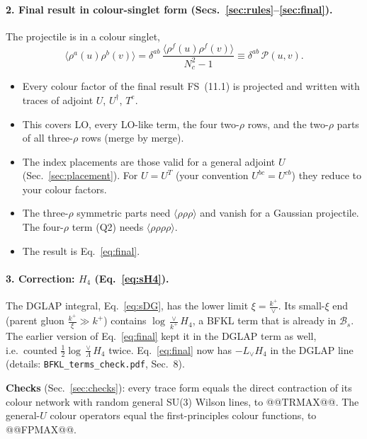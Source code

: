 \documentclass[10pt]{article}
\numberwithin{equation}{section}
\newcommand{\new}[1]{{\color{blue}#1}}
\newcommand{\Lv}{L_{\vee}}
\newcommand{\BB}{\mathcal B}
\newcommand{\PP}{\mathcal P}
\begin{document}
\paragraph{2. Final result in colour-singlet form (Secs.~\ref{sec:rules}--\ref{sec:final}).} The projectile is in a colour singlet,
\begin{equation*}
\langle\rho^a(u)\rho^b(v)\rangle=\delta^{ab}\,\frac{\langle\rho^f(u)\rho^f(v)\rangle}{N_c^2-1}\equiv\delta^{ab}\,\PP(u,v).
\end{equation*}
\begin{itemize}
\item Every colour factor of the final result FS~(11.1) is projected and written with traces of adjoint $U$, $U^\dagger$, $T^e$.
\item This covers LO, every LO-like term, the four two-$\rho$ rows, and the two-$\rho$ parts of all three-$\rho$ rows (merge by merge).
\item The index placements are those valid for a general adjoint $U$ (Sec.~\ref{sec:placement}). For $U=U^T$ (your convention $U^{bc}=U^{cb}$) they reduce to your colour factors.
\item The three-$\rho$ symmetric parts need $\langle\rho\rho\rho\rangle$ and vanish for a Gaussian projectile. The four-$\rho$ term (Q2) needs $\langle\rho\rho\rho\rho\rangle$.
\item The result is Eq.~\eqref{eq:final}.
\end{itemize}
\paragraph{\new{3. Correction: $H_4$ (Eq.~\eqref{eq:sH4}).}} \new{The DGLAP integral, Eq.~\eqref{eq:sDG}, has the lower limit $\xi=\frac{k^+}{\vee}$. Its small-$\xi$ end (parent gluon $\frac{k^+}{\xi}\gg k^+$) contains $\log\frac{\vee}{k^+}H_4$, a BFKL term that is already in $\BB_s$. The earlier version of Eq.~\eqref{eq:final} kept it in the DGLAP term as well, i.e.\ counted $\frac12\log\frac\vee\Lambda H_4$ twice. Eq.~\eqref{eq:final} now has $-\Lv H_4$ in the DGLAP line (details: \texttt{BFKL\_terms\_check.pdf}, Sec.~8).}

\textbf{Checks} (Sec.~\ref{sec:checks}): every trace form equals the direct contraction of its colour network with random general SU(3) Wilson lines, to @@TRMAX@@. The general-$U$ colour operators equal the first-principles colour functions, to @@FPMAX@@.

\end{document}
